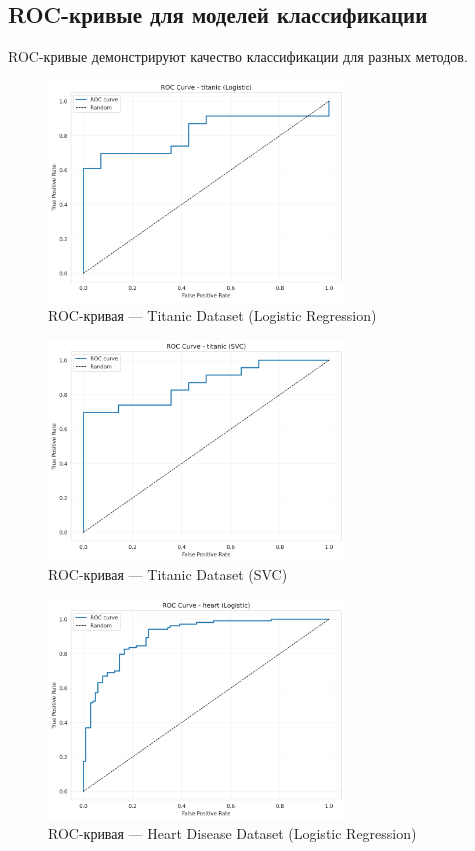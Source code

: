 \documentclass[a4paper]{article}
\begin{document}
\subsection{ROC-кривые для моделей классификации}

ROC-кривые демонстрируют качество классификации для разных методов.

\begin{figure}[H]
\centering
\includegraphics[width=0.7\textwidth]{images/roc_curve_titanic_logistic.png}
\caption{ROC-кривая — Titanic Dataset (Logistic Regression)}
\end{figure}

\begin{figure}[H]
\centering
\includegraphics[width=0.7\textwidth]{images/roc_curve_titanic_svc.png}
\caption{ROC-кривая — Titanic Dataset (SVC)}
\end{figure}

\begin{figure}[H]
\centering
\includegraphics[width=0.7\textwidth]{images/roc_curve_heart_logistic.png}
\caption{ROC-кривая — Heart Disease Dataset (Logistic Regression)}
\end{figure}
\end{document}
